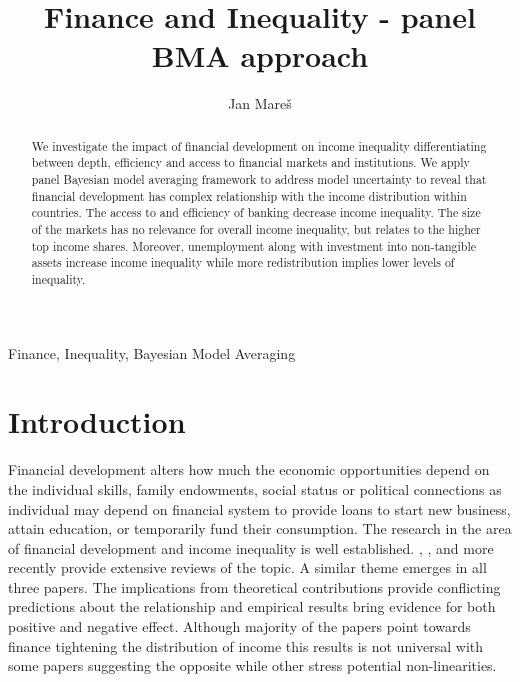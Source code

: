 \documentclass[preprint, nonatbib, 10pt]{elsarticle}
\begin{document}
\begin{frontmatter}

\title{Finance and Inequality - panel BMA approach}

\author[1]{Jan Mare\v{s}}
\address[1]{IES, Faculty of Social Sciences, Charles University, Opletalova 26, Prague}



\begin{abstract}
We investigate the impact of financial development on income inequality differentiating between depth, efficiency and access to financial markets and institutions. We apply panel Bayesian model averaging framework to address model uncertainty to reveal that financial development has complex relationship   with the income distribution within countries. The access to and efficiency of banking decrease income inequality. The size of the markets has no relevance for overall income inequality, but relates to the higher top income shares. Moreover, unemployment along with investment into non-tangible assets increase income inequality while more redistribution implies lower levels of inequality.
\end{abstract}

\begin{keyword}
Finance, Inequality, Bayesian Model Averaging
\end{keyword}

\end{frontmatter}


\section{Introduction}
\label{ch4sec:intro}
Financial development alters how much the economic opportunities depend on the individual skills, family endowments, social status or political connections as individual may depend on financial system to provide loans to start new business, attain education, or temporarily fund their consumption. The research in the area of financial development and income inequality is well established. \textcite{demirgucc2009finance}, \textcite{claessens2007finance}, and more recently \cite{de2017finance} provide extensive reviews of the topic. A similar theme emerges in all three papers. The implications from theoretical contributions provide conflicting predictions about the relationship and empirical results bring evidence for both positive and negative effect. Although majority of the papers point towards finance tightening the distribution of income this results is not universal with some papers suggesting the opposite while other stress potential non-linearities.
\end{document}
